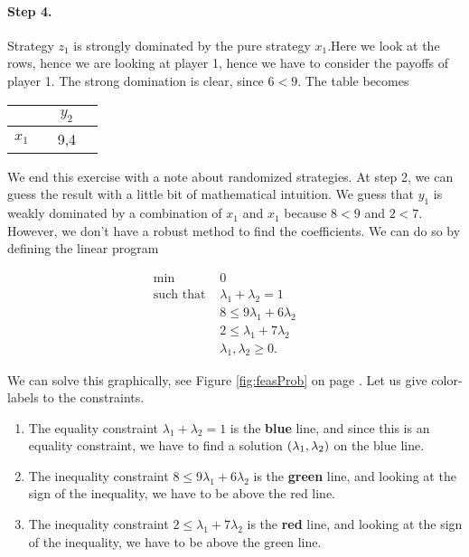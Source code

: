 \paragraph{Step 4.} Strategy $z_{1}$ is strongly dominated by the pure strategy $x_{1}$.Here we look at the rows, hence we are looking at player 1, hence we have to consider the payoffs of player 1. The strong domination is clear, since $6 < 9$. The table becomes

\begin{tabular}[h!]{l|ccc}
		&& $y_2$ \\
		\hline
		$x_1$ && 9,4 &
	\end{tabular} 
	

\vspace{10mm}

We end this exercise with a note about randomized strategies. At step 2, we can guess the result with a little bit of mathematical intuition. We guess that $y_1$ is weakly dominated by a combination of $x_{1}$ and $x_{1}$ because $8 < 9$ and $2 < 7$. However, we don't have a robust method to find the coefficients. We can do so by defining the linear program


        

\begin{equation*}
    \begin{aligned}
    \underset{}{\text{min }} &
    0 & & \\
    \text{such that  } &
        \lambda_{1} + \lambda_{2} = 1 & \\
        & 8 \leq 9 \lambda_{1} + 6 \lambda_{2} &  \\
        & 2 \leq \lambda_{1} + 7 \lambda_{2} & \\
        & \lambda_{1}, \lambda_{2} \geq 0. &
    \end{aligned}
\end{equation*}
   

We can solve this graphically, see Figure \ref{fig:feasProb} on page \pageref{fig:feasProb}. Let us give color-labels to the constraints.
\begin{enumerate}
    \item The equality constraint $\lambda_{1} + \lambda_{2} = 1$ is the \textbf{blue} line, and since this is an equality constraint, we have to find a solution $\left(\lambda_{1}, \lambda_{2}\right)$ on the blue line.
    \item The inequality constraint $8 \leq 9 \lambda_{1} + 6 \lambda_{2}$ is the \textbf{green} line, and looking at the sign of the inequality, we have to be above the red line.
    \item The inequality constraint $2 \leq \lambda_{1} + 7 \lambda_{2}$ is the \textbf{red} line, and looking at the sign of the inequality, we have to be above the green line.
\end{enumerate}


